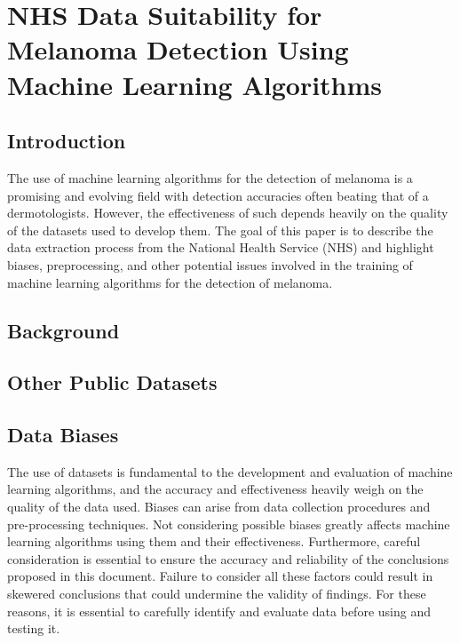 \chapter{NHS Data Suitability for Melanoma Detection Using Machine Learning Algorithms}

\section{Introduction}
The use of machine learning algorithms for the detection of melanoma is a promising and evolving field with detection accuracies often beating that of a dermotologists\cite{}. However, the effectiveness of such depends heavily on the quality of the datasets used to develop them\cite{}. The goal of this paper is to describe the data extraction process from the National Health Service (NHS) and highlight biases, preprocessing, and other potential issues involved in the training of machine learning algorithms for the detection of melanoma.

\section{Background}



\section{Other Public Datasets}

\section{Data Biases}
The use of datasets is fundamental to the development and evaluation of machine learning algorithms, and the accuracy and effectiveness heavily weigh on the quality of the data used. Biases can arise from data collection procedures and pre-processing techniques. Not considering possible biases greatly affects machine learning algorithms using them and their effectiveness. Furthermore, careful consideration is essential to ensure the accuracy and reliability of the conclusions proposed in this document. Failure to consider all these factors could result in skewered conclusions that could undermine the validity of findings. For these reasons, it is essential to carefully identify and evaluate data before using and testing it.


